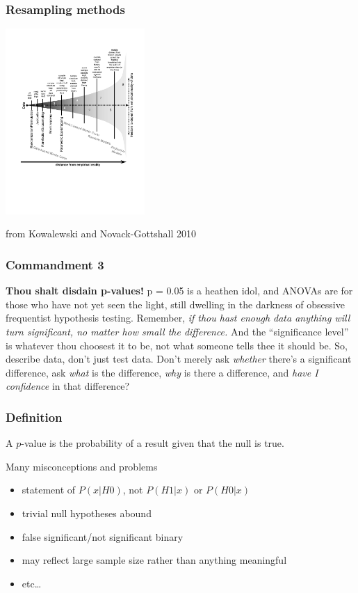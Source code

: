 \documentclass{beamer}\usepackage{graphicx, color}
\begin{document}
\begin{frame}
\frametitle{Resampling methods}
\centering \includegraphics[trim = 0pt 250pt 0pt 85pt, height = 200pt, keepaspectratio = true]{reality}

\footnotesize{from Kowalewski and Novack-Gottshall 2010}
\end{frame}


\begin{frame}
\frametitle{Commandment 3}
\textbf{Thou shalt disdain p-values! }
p = 0.05 is a heathen idol, and ANOVAs are for those who have not yet seen the light, still dwelling in the darkness of obsessive frequentist hypothesis testing. 
Remember, \emph{if thou hast enough data anything will turn significant, no matter how small the difference.} 
And the ``significance level'' is whatever thou choosest it to be, not what someone tells thee it should be. 
So, describe data, don't just test data. 
Don't merely ask \emph{whether} there's a significant difference, ask \emph{what} is the difference, \emph{why} is there a difference, and \emph{have I confidence} in that difference?
\end{frame}


\begin{frame}
\frametitle{Definition}
A \(p\)-value is the probability of a result given that the null is true.

Many misconceptions and problems
\begin{itemize}
\item statement of \(P(x | H0)\), not \(P(H1 | x)\) or \(P(H0 | x)\)
\item trivial null hypotheses abound
\item false significant/not significant binary
\item may reflect large sample size rather than anything meaningful
\item etc\ldots
\end{itemize}
\end{frame}
\end{document}
